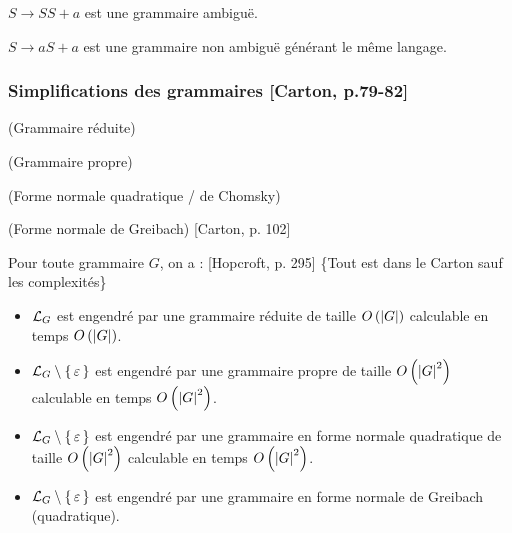 \documentclass[../../agregation.tex]{subfiles}
\begin{document}
\begin{example}
	$S\to SS+a$ est une grammaire ambiguë.
\end{example}

\begin{rem}
	$S\to aS+a$ est une grammaire non ambiguë générant le même langage.
\end{rem}

















\subsubsection{Simplifications des grammaires {[}Carton, p.79-82{]}}
\begin{defn}
	(Grammaire réduite)
\end{defn}

\begin{defn}
	(Grammaire propre)
\end{defn}

\begin{defn}
	(Forme normale quadratique / de Chomsky)
\end{defn}

\begin{defn}
	(Forme normale de Greibach) {[}Carton, p. 102{]}\end{defn}
\begin{prop}
	Pour toute grammaire $G$, on a : {[}Hopcroft, p. 295{]} \{Tout est
	dans le Carton sauf les complexités\}
	\begin{itemize}
		\item $\mathcal{L}_{G}$ est engendré par une grammaire réduite de taille $O\left(\left|G\right|\right)$
		calculable en temps $O\left(\left|G\right|\right)$.
		\item $\mathcal{L}_{G}\setminus\set{\varepsilon}$ est engendré par une grammaire
		propre de taille $O\left(\left|G\right|^{2}\right)$ calculable en temps $O\left(\left|G\right|^{2}\right)$.
		\item $\mathcal{L}_{G}\setminus\set{\varepsilon}$ est engendré par une grammaire
		en forme normale quadratique de taille $O\left(\left|G\right|^{2}\right)$
		calculable en temps $O\left(\left|G\right|^{2}\right)$.
		\item $\mathcal{L}_{G}\setminus\set{\varepsilon}$ est engendré par une grammaire
		en forme normale de Greibach (quadratique).
	\end{itemize}
\end{prop}
\end{document}
